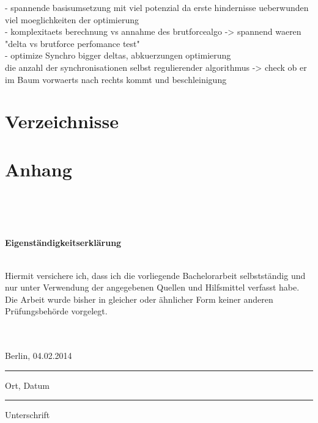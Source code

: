\documentclass[a4paper,11pt,oneside,%
headsepline,												%
footsepline,												%
bibtotocnumbered									%
]{scrreprt}
\begin{document}
- spannende basisumsetzung mit viel potenzial da erste hindernisse ueberwunden viel moeglichkeiten der optimierung\\
- komplexitaets berechnung vs annahme des brutforcealgo -> spannend waeren "delta vs brutforce perfomance test"\\
- optimize Synchro bigger deltas, abkuerzungen optimierung\\

die anzahl der synchronisationen selbst regulierender algorithmus -> check ob er im Baum vorwaerts nach rechts kommt und beschleinigung\\
\newpage
\listoftodos[Notes]

\newpage
\printbibheading
\printbibliography[type=book,heading=subbibliography,title={Buch Quellen}]
\printbibliography[nottype=book,heading=subbibliography,title={Andere Quellen}]


\chapter{Verzeichnisse}

\chapter{Anhang}

\newpage

\hfil\\\\\\

\begin{LARGE}
\textbf{Eigenständigkeitserklärung}\\\\
\end{LARGE} 
Hiermit versichere ich, dass ich die vorliegende Bachelorarbeit selbstständig und nur
unter Verwendung der angegebenen Quellen und Hilfsmittel verfasst habe. Die Arbeit
wurde bisher in gleicher oder ähnlicher Form keiner anderen Prüfungsbehörde vorgelegt.\\\\\\

\parbox{4cm}{\centering Berlin, 04.02.2014\hrule
\strut \centering\footnotesize Ort, Datum} \hfill\parbox{4cm}{\hrule
\strut \centering\footnotesize Unterschrift}
\end{document}
